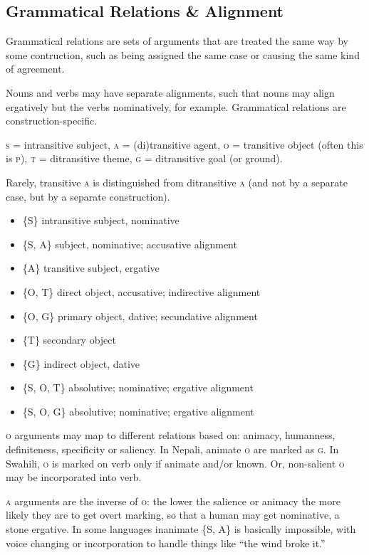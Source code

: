 \documentclass[11pt]{article}
\newcommand{\I}[1]{\textsc{#1}}   %
\newenvironment{grammarlist}%
 {\begin{itemize}\addtolength{\itemsep}{-0.5\baselineskip}\ignorespaces}%
 {\end{itemize}\ignorespacesafterend}
\begin{document}
\subsection{Grammatical Relations \& Alignment}
Grammatical relations are sets of arguments that are treated the same
way by some contruction, such as being assigned the same case or
causing the same kind of agreement.

Nouns and verbs may have separate alignments, such that nouns may
align ergatively but the verbs nominatively, for example.  Grammatical
relations are construction-specific.

\I{s} = intransitive subject, \I{a} = (di)transitive agent, \I{o} =
transitive object (often this is \I{p}), \I{t} = ditransitive theme,
\I{g} = ditransitive goal (or ground).

Rarely, transitive \I{a} is distinguished from ditransitive \I{a} (and
not by a separate case, but by a separate construction).

\begin{grammarlist}
  \item \{\I{S}\} intransitive subject, nominative
  \item \{\I{S, A}\} subject, nominative; accusative alignment
  \item \{\I{A}\} transitive subject, ergative
  \item \{\I{O, T}\} direct object, accusative; indirective alignment
  \item \{\I{O, G}\} primary object, dative; secundative alignment
  \item \{\I{T}\} secondary object
  \item \{\I{G}\} indirect object, dative
  \item \{\I{S, O, T}\} absolutive; nominative; ergative alignment
  \item \{\I{S, O, G}\} absolutive; nominative; ergative alignment
\end{grammarlist}

\I{o} arguments may map to different relations based on: animacy,
humanness, definiteness, specificity or saliency.  In Nepali, animate
\I{o} are marked as \I{g}.  In Swahili, \I{o} is marked on verb only
if animate and/or known.  Or, non-salient \I{o} may be incorporated
into verb.

\I{a} arguments are the inverse of \I{o}: the lower the salience or
animacy the more likely they are to get overt marking, so that a human
may get nominative, a stone ergative.  In some languages inanimate
\{\I{S, A}\} is basically impossible, with voice changing or
incorporation to handle things like ``the wind broke it.''
\end{document}
